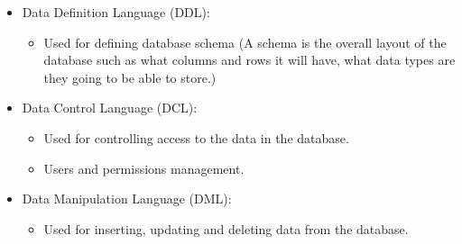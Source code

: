 \begin{itemize}
\begin{itemize}
            \item Data Definition Language (DDL):
                \begin{itemize}
                    \item Used for defining database schema (A schema is the overall layout of the database such as what columns and rows it will have, what data types are they going to be able to store.)
                \end{itemize}
            
            \item Data Control Language (DCL):
                \begin{itemize}
                    \item Used for controlling access to the data in the database.
                    \item Users and permissions management.
                \end{itemize}
            
            \item Data Manipulation Language (DML):
                \begin{itemize}
                    \item Used for inserting, updating and deleting data from the database.
                \end{itemize}
        \end{itemize}
\end{itemize}

